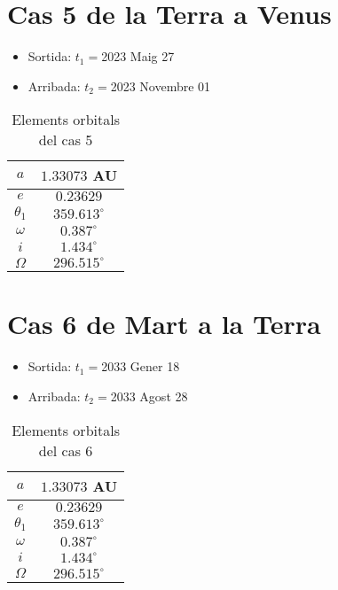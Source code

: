 \section{Cas 5 de la Terra a Venus}
\begin{itemize}
	\item Sortida: $t_{1}=$2023 Maig 27
	\item Arribada: $t_{2}=$2023 Novembre 01
\end{itemize}
\begin{table}[h!]
	\centering
	\begin{tabular}{ |c|c|}
		\hline
		$a$ & $1.33073$ AU \\ \hline
		$e$ & $0.23629$ \\ \hline
		$\theta_{1}$ & $359.613^{\circ}$ \\ \hline
		$\omega$ & $0.387^{\circ}$ \\ \hline
		$i$ & $1.434^{\circ}$ \\ \hline
		$\Omega$ & $296.515^{\circ}$ \\ \hline
	\end{tabular}
	\caption{Elements orbitals del cas 5}
\end{table}

\section{Cas 6 de Mart a la Terra}
\begin{itemize}
	\item Sortida: $t_{1}=$2033 Gener 18
	\item Arribada: $t_{2}=$2033 Agost 28
\end{itemize}
\begin{table}[h!]
	\centering
	\begin{tabular}{ |c|c|}
		\hline
		$a$ & $1.33073$ AU \\ \hline
		$e$ & $0.23629$ \\ \hline
		$\theta_{1}$ & $359.613^{\circ}$ \\ \hline
		$\omega$ & $0.387^{\circ}$ \\ \hline
		$i$ & $1.434^{\circ}$ \\ \hline
		$\Omega$ & $296.515^{\circ}$ \\ \hline
	\end{tabular}
	\caption{Elements orbitals del cas 6}
\end{table}


